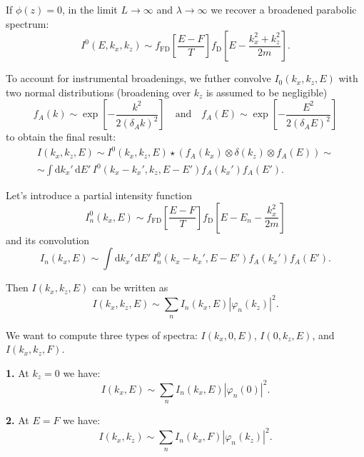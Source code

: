 \documentclass[10pt]{article}
\newcommand{\dd}{\mathrm{d}}
\newcommand{\abs}[1]{\left\lvert#1\right\rvert}
\begin{document}
If $\phi(z) = 0$, in the limit $L \to \infty$ and $\lambda \to \infty$ we
recover a broadened parabolic spectrum:
\begin{equation}
	I^0(E, k_x, k_z) \sim f_{\mathrm{FD}}\left[ \frac{E - F}{T} \right]
		f_{\mathrm{D}}\left[ E - \frac{k_x^2 + k_z^2}{2m} \right].
\end{equation}

To account for instrumental broadenings, we futher convolve $I_0(k_x, k_z, E)$
with two normal distributions (broadening over $k_z$ is assumed to be negligible)
\begin{equation}
	f_A(k) \sim \exp\left[ -\frac{k^2}{2(\delta_A k)^2} \right]
	\quad \text{and} \quad
	f_A(E) \sim \exp\left[ -\frac{E^2}{2(\delta_A E)^2} \right]
\end{equation}
to obtain the final result:
\begin{multline}
	I(k_x, k_z, E) \sim I^0(k_x, k_z, E) \star (f_A(k_x) \otimes \delta(k_z)
	\otimes f_A(E)) \sim \\
	\sim \int \dd k_x' \, \dd E' \, I^0(k_x - k_x', k_z, E - E') f_A(k_x') f_A(E').
\end{multline}

Let's introduce a partial intensity function
\begin{equation}
	I_n^0(k_x, E) \sim f_{\mathrm{FD}}\left[ \frac{E - F}{T} \right]
		f_{\mathrm{D}}\left[ E - E_n - \frac{k_x^2}{2m} \right]
\end{equation}
and its convolution
\begin{equation}
	I_n(k_x, E) \sim \int \dd k_x' \, \dd E' \, I_n^0(k_x - k_x', E - E')
		f_A(k_x') f_A(E').
\end{equation}

Then $I(k_x, k_z, E)$ can be written as
\begin{equation}
	I(k_x, k_z, E) \sim \sum_n I_n(k_x, E) \abs{\varphi_n(k_z)}^2.
\end{equation}

We want to compute three types of spectra: $I(k_x, 0, E)$, $I(0, k_z, E)$,
and $I(k_x, k_z, F)$.

\textbf{1.} At $k_z = 0$ we have:
\begin{equation}
	I(k_x, E) \sim \sum_n I_n(k_x, E) \abs{\varphi_n(0)}^2.
\end{equation}

\textbf{2.} At $E = F$ we have:
\begin{equation}
	I(k_x, k_z) \sim \sum_n I_n(k_x, F) \abs{\varphi_n(k_z)}^2.
\end{equation}
\end{document}
